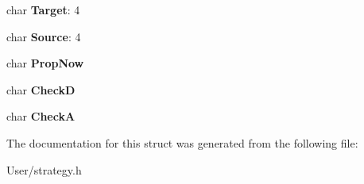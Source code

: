 \begin{DoxyCompactItemize}
\item 
\hypertarget{struct_r_e_c_e_i_v_e_abf2270aa1f372f46db5005037079dc02}{}char {\bfseries Target}\+: 4\label{struct_r_e_c_e_i_v_e_abf2270aa1f372f46db5005037079dc02}

\item 
\hypertarget{struct_r_e_c_e_i_v_e_ac15719827ec66fa8073c1c4c77ea60b9}{}char {\bfseries Source}\+: 4\label{struct_r_e_c_e_i_v_e_ac15719827ec66fa8073c1c4c77ea60b9}

\item 
\hypertarget{struct_r_e_c_e_i_v_e_a16405079da03278cfe2e245c5d9cc7e1}{}char {\bfseries Prop\+Now}\label{struct_r_e_c_e_i_v_e_a16405079da03278cfe2e245c5d9cc7e1}

\item 
\hypertarget{struct_r_e_c_e_i_v_e_a4a98b1c4366c32fbd2b2178a9366d419}{}char {\bfseries Check\+D}\label{struct_r_e_c_e_i_v_e_a4a98b1c4366c32fbd2b2178a9366d419}

\item 
\hypertarget{struct_r_e_c_e_i_v_e_a04bb072b1d1d2383e4d42c0efad2899a}{}char {\bfseries Check\+A}\label{struct_r_e_c_e_i_v_e_a04bb072b1d1d2383e4d42c0efad2899a}

\end{DoxyCompactItemize}


The documentation for this struct was generated from the following file\+:\begin{DoxyCompactItemize}
\item 
User/strategy.\+h\end{DoxyCompactItemize}
